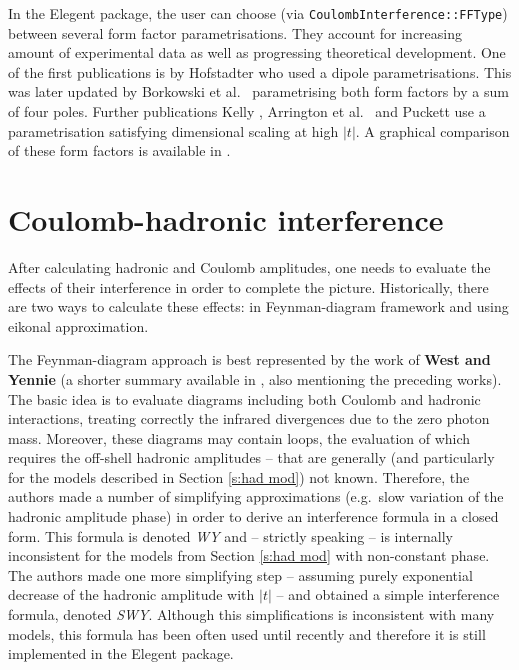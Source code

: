\documentclass[preprint,12pt]{elsarticle}
\begin{document}
In the Elegent package, the user can choose (via {\tt CoulombInterference::FFType}) between several form factor parametrisations. They account for increasing amount of experimental data as well as progressing theoretical development. One of the first publications is by Hofstadter \cite{hofstadter58} who used a dipole parametrisations. This was later updated by Borkowski et al.~\cite{borkowski74,borkowski75} parametrising both form factors by a sum of four poles. Further publications Kelly \cite{kelly04}, Arrington et al.~\cite{arrington07} and Puckett \cite{puckett10} use a parametrisation satisfying dimensional scaling at high $|t|$. A graphical comparison of these form factors is available in \cite[Figure~1.7]{jan_thesis}.




\section{Coulomb-hadronic interference}\label{s:int mod}

After calculating hadronic and Coulomb amplitudes, one needs to evaluate the effects of their interference in order to complete the picture. Historically, there are two ways to calculate these effects: in Feynman-diagram framework and using eikonal approximation.

The Feynman-diagram approach is best represented by the work of {\bf West and Yennie} \cite{wy68} (a shorter summary available in \cite[section 1.3.4]{jan_thesis}, also mentioning the preceding works). The basic idea is to evaluate diagrams including both Coulomb and hadronic interactions, treating correctly the infrared divergences due to the zero photon mass. Moreover, these diagrams may contain loops, the evaluation of which requires the off-shell hadronic amplitudes -- that are generally (and particularly for the models described in Section \ref{s:had mod}) not known. Therefore, the authors made a number of simplifying approximations (e.g.~slow variation of the hadronic amplitude phase) in order to derive an interference formula in a closed form. This formula is denoted {\em WY} and -- strictly speaking -- is internally inconsistent for the models from Section \ref{s:had mod} with non-constant phase. The authors made one more simplifying step -- assuming purely exponential decrease of the hadronic amplitude with $|t|$ -- and obtained a simple interference formula, denoted {\em SWY}. Although this simplifications is inconsistent with many models, this formula has been often used until recently and therefore it is still implemented in the Elegent package.
\end{document}
